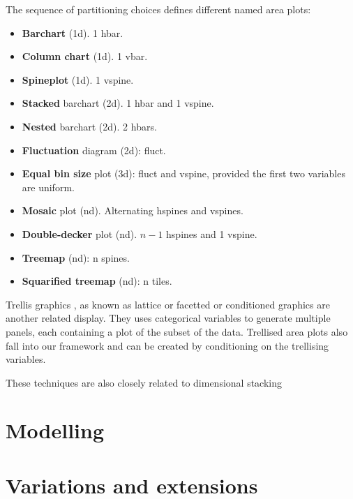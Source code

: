 \documentclass[letterpaper,oneside]{scrartcl}
\begin{document}
The sequence of partitioning choices defines different named area plots:

\begin{itemize}
  \item {\bf Barchart} (1d). 1 hbar.
  \item {\bf Column chart} (1d). 1 vbar.
  \item {\bf Spineplot} (1d). 1 vspine.

  \item {\bf Stacked} barchart (2d). 1 hbar and 1 vspine.
  \item {\bf Nested} barchart (2d).  2 hbars. \citep{peltier:2009}
  \item {\bf Fluctuation} diagram (2d): fluct.

  \item {\bf Equal bin size} plot (3d): fluct and vspine, provided the first two variables are uniform.

  \item {\bf Mosaic} plot (nd).  Alternating hspines and vspines.  \citep{hartigan:1984,hartigan:1981,friendly:1994,hofmann:2003}
  \item {\bf Double-decker} plot (nd).  $n-1$ hspines and 1 vspine. \citep{hofmann:2001}
  \item {\bf Treemap} (nd): n spines. \citep{shneiderman:1992}
  \item {\bf Squarified treemap} (nd): n tiles. \citep{bruls:1999}

\end{itemize}

Trellis graphics \citep{becker:1996}, as known as lattice or facetted or
conditioned graphics are another related display. They uses categorical
variables to generate multiple panels, each containing a plot of the subset of
the data. Trellised area plots also fall into our framework and can be
created by conditioning on the trellising variables.

These techniques are also closely related to dimensional stacking \citep{leblanc:1990}


\section{Modelling}
\label{sec:models}

\section{Variations and extensions}
\label{sec:variations}
\end{document}
